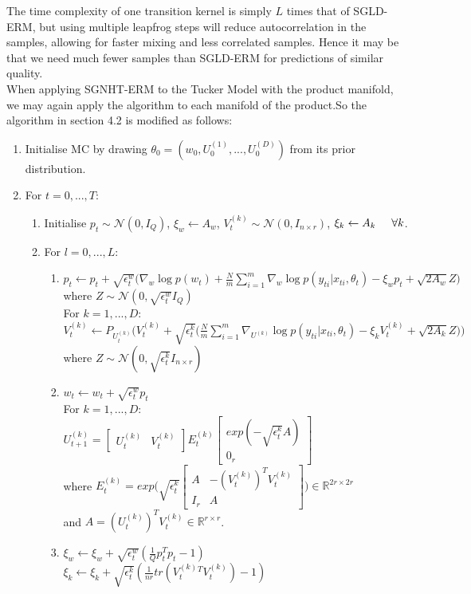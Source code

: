 \documentclass[a4paper,10pt]{article}
\newcommand{\forceindent}{\leavevmode{\parindent=2em\indent}}
\begin{document}
The time complexity of one transition kernel is simply $L$ times that of SGLD-ERM, but using multiple leapfrog steps will reduce autocorrelation in the samples, allowing for faster mixing and less correlated samples. Hence it may be that we need much fewer samples than SGLD-ERM for predictions of similar quality. \\

When applying SGNHT-ERM to the Tucker Model with the product manifold, we may again apply the algorithm to each manifold of the product.So the algorithm in section 4.2 is modified as follows:
\begin{enumerate}
\item Initialise MC by drawing $\theta_0=(w_0,U_0^{(1)},...,U_0^{(D)})$ from its prior distribution. 
\item For $t=0,...,T$:
\begin{enumerate}
\item Initialise $p_t \sim \mathcal{N}(0,I_Q)$, $\xi_w \leftarrow A_w$, $V^{(k)}_t\sim \mathcal{N}(0,I_{n \times r})$, $\xi_k \leftarrow A_k \hspace{5mm} \forall k$.
\item For $l=0,...,L$:
\begin{enumerate}
\item \mbox{$p_t \leftarrow p_t + \sqrt{\epsilon_t^w} \Big(\nabla_w\log p(w_t)+\frac{N}{m} \sum_{i=1}^m \nabla_w\log p(y_{ti}|x_{ti},\theta_t)-\xi_w p_t +\sqrt{2A_w}Z \Big)$} \\
where $Z \sim \mathcal{N}(0,\sqrt{\epsilon_t^w}I_Q)$ \\
For $k=1,...,D$: \\
\forceindent \mbox{$V_t^{(k)} \leftarrow P_{U_t^{(k)}}\bigg(V_t^{(k)}+\sqrt{\epsilon_t^k}\Big(\frac{N}{m} \sum_{i=1}^m \nabla_{U^{(k)}}\log p(y_{ti}|x_{ti},\theta_t) -\xi_kV_t^{(k)} +\sqrt{2A_k}Z \Big)\bigg)$} \\
where $Z \sim \mathcal{N}(0,\sqrt{\epsilon_t^k}I_{n \times r})$
\item $w_t \leftarrow w_t + \sqrt{\epsilon_t^w}p_t$ \\
For $k=1,...,D$: \\
\forceindent $U_{t+1}^{(k)}=
\begin{bmatrix}
U_t^{(k)} & V_t^{(k)}
\end{bmatrix}
E_t^{(k)}
\begin{bmatrix}
exp(-\sqrt{\epsilon_t^k} A)\\
0_r
\end{bmatrix}$ \\
\forceindent where $E_t^{(k)}=exp \bigg( \sqrt{\epsilon_t^k}
\begin{bmatrix}
A & -(V_t^{(k)})^T V_t^{(k)} \\
I_r & A
\end{bmatrix}
\bigg) \in \mathbb{R}^{2r \times 2r}$ \\
\forceindent and $A=(U_t^{(k)})^T V_t^{(k)} \in \mathbb{R}^{r \times r}$.
\item $\xi_w \leftarrow \xi_w + \sqrt{\epsilon_t^w}(\frac{1}{Q}p_t^T p_t -1)$ \\ 
$\xi_k \leftarrow \xi_k + \sqrt{\epsilon_t^k}(\frac{1}{nr}tr(V_t^{(k)} ^T V_t^{(k)}) -1)$


\end{enumerate}
\end{enumerate}
\end{enumerate}
\end{document}
